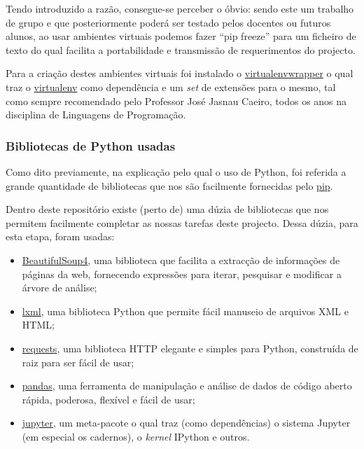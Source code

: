 \documentclass[a4paper,10pt]{article}
\begin{document}
Tendo introduzido a razão, consegue-se perceber o óbvio: sendo este um trabalho de grupo e que posteriormente poderá ser testado pelos docentes ou futuros alunos, ao usar ambientes virtuais podemos fazer ``pip freeze'' para um ficheiro de texto do qual facilita a portabilidade e transmissão de requerimentos do projecto.

Para a criação destes ambientes virtuais foi instalado o \href{https://pypi.org/project/virtualenvwrapper/}{virtualenvwrapper} o qual traz o \href{https://pypi.org/project/virtualenv/}{virtualenv} como dependência e um \textit{set} de extensões para o mesmo, tal como sempre recomendado pelo Professor José Jasnau Caeiro, todos os anos na disciplina de Linguagens de Programação.

\subsubsection{Bibliotecas de Python usadas}

Como dito previamente, na explicação pelo qual o uso de Python, foi referida a grande quantidade de bibliotecas que nos são facilmente fornecidas pelo \href{https://pypi.org/project/pip/}{pip}.

Dentro deste repositório existe (perto de) uma dúzia de bibliotecas que nos permitem facilmente completar as nossas tarefas deste projecto. Dessa dúzia, para esta etapa, foram usadas:

\begin{itemize}
  \item \href{https://pypi.org/project/beautifulsoup4/}{BeautifulSoup4}, uma biblioteca que facilita a extracção de informações de páginas da web, fornecendo expressões para iterar, pesquisar e modificar a árvore de análise;
  \item \href{https://pypi.org/project/lxml/}{lxml}, uma biblioteca Python que permite fácil manuseio de arquivos XML e HTML;
  \item \href{https://pypi.org/project/requests/}{requests}, uma biblioteca HTTP elegante e simples para Python, construída de raiz para ser fácil de usar;
  \item \href{https://pypi.org/project/pandas/}{pandas}, uma ferramenta de manipulação e análise de dados de código aberto rápida, poderosa, flexível e fácil de usar;
  \item \href{pip install jupyter}{jupyter}, um meta-pacote o qual traz (como dependências) o sistema Jupyter (em especial os cadernos), o \textit{kernel} IPython e outros.
\end{itemize}
\end{document}
